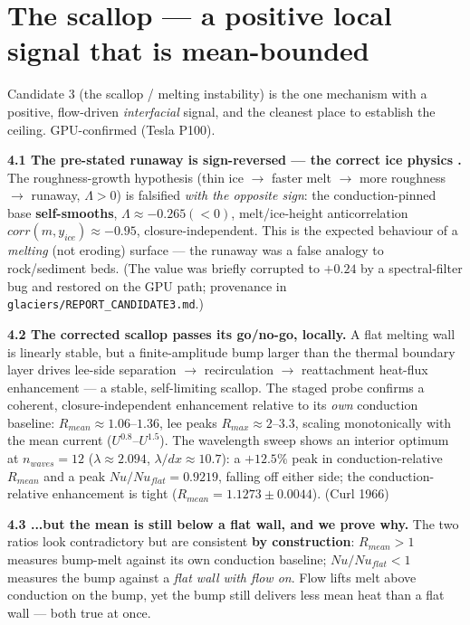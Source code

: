 \documentclass[tc, manuscript]{copernicus}
\begin{document}
\section{The scallop — a positive local signal that is mean-bounded}

Candidate 3 (the scallop / melting instability) is the one mechanism with a positive, flow-driven \emph{interfacial} signal, and the cleanest place to establish the ceiling. GPU-confirmed (Tesla P100).

\textbf{4.1 The pre-stated runaway is sign-reversed — the correct ice physics .} The roughness-growth hypothesis (thin ice \ensuremath{\to} faster melt \ensuremath{\to} more roughness \ensuremath{\to} runaway, $\Lambda >0$) is falsified \emph{with the opposite sign}: the conduction-pinned base \textbf{self-smooths}, $\Lambda \approx -0.265 (<0)$, melt/ice-height anticorrelation $corr(m,y_{ice})\approx -0.95$, closure-independent. This is the expected behaviour of a \emph{melting} (not eroding) surface — the runaway was a false analogy to rock/sediment beds. (The value was briefly corrupted to $+0.24$ by a spectral-filter bug and restored on the GPU path; provenance in \texttt{glaciers/\allowbreak{}REPORT\_\allowbreak{}CANDIDATE3.\allowbreak{}md}.)

\textbf{4.2 The corrected scallop passes its go/no-go, locally.} A flat melting wall is linearly stable, but a finite-amplitude bump larger than the thermal boundary layer drives lee-side separation \ensuremath{\to} recirculation \ensuremath{\to} reattachment heat-flux enhancement — a stable, self-limiting scallop. The staged probe confirms a coherent, closure-independent enhancement relative to its \emph{own} conduction baseline: $R_{mean}\approx 1.06\mbox{--}1.36$, lee peaks $R_{max}\approx 2\mbox{--}3.3$, scaling monotonically with the mean current ($U^{0.8}\mbox{--}U^{1.5}$). The wavelength sweep shows an interior optimum at $n_{waves}=12$ ($\lambda \approx 2.094$, $\lambda /dx\approx 10.7$): a $+12.5\%$ peak in conduction-relative $R_{mean}$ and a peak $Nu/Nu_{flat}=0.9219$, falling off either side; the conduction-relative enhancement is tight ($R_{mean}=1.1273\pm 0.0044$). (Curl 1966)

\textbf{4.3 ...but the mean is still below a flat wall, and we prove why.} The two ratios look contradictory but are consistent \textbf{by construction}: $R_{mean}>1$ measures bump-melt against its own conduction baseline; $Nu/Nu_{flat}<1$ measures the bump against a \emph{flat wall with flow on}. Flow lifts melt above conduction on the bump, yet the bump still delivers less mean heat than a flat wall — both true at once.
\end{document}
